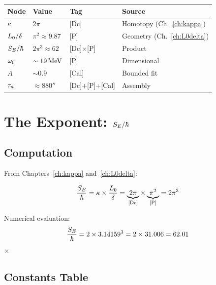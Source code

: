 \begin{center}
\begin{tabular}{llll}
\toprule
\textbf{Node} & \textbf{Value} & \textbf{Tag} & \textbf{Source} \\
\midrule
$\kappa$ & $2\pi$ & [Dc] & Homotopy (Ch.~\ref{ch:kappa}) \\
$L_0/\delta$ & $\pi^2 \approx 9.87$ & [P] & Geometry (Ch.~\ref{ch:L0delta}) \\
$S_E/\hbar$ & $2\pi^3 \approx 62$ & [Dc]$\times$[P] & Product \\
$\omega_0$ & $\sim 19\,\mathrm{MeV}$ & [P] & Dimensional \\
$A$ & $\sim 0.9$ & [Cal] & Bounded fit \\
$\tau_n$ & $\approx 880\second$ & [Dc]+[P]+[Cal] & Assembly \\
\bottomrule
\end{tabular}
\end{center}

\section{The Exponent: $S_E/\hbar$}
\label{sec:taun:exponent}

\subsection{Computation}

From Chapters~\ref{ch:kappa} and~\ref{ch:L0delta}:

\begin{derivationbox}[title=Euclidean Action Exponent]
\begin{equation}
    \frac{S_E}{\hbar} = \kappa \times \frac{L_0}{\delta}
                      = \underbrace{2\pi}_{\text{[Dc]}} \times \underbrace{\pi^2}_{\text{[P]}}
                      = 2\pi^3
\end{equation}

Numerical evaluation:
\begin{equation}
    \frac{S_E}{\hbar} = 2 \times 3.14159^3 = 2 \times 31.006 = 62.01
    \label{eq:SE_numeric}
\end{equation}
\tagDc $\times$ \tagP
\end{derivationbox}

\subsection{Constants Table}

